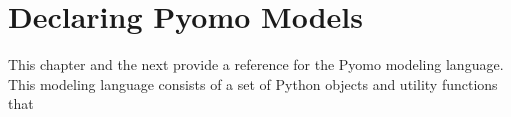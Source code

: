 \chapter{Declaring Pyomo Models}

This chapter and the next provide a reference for the Pyomo modeling language.
This modeling language consists of a set of Python objects and utility
functions that 















